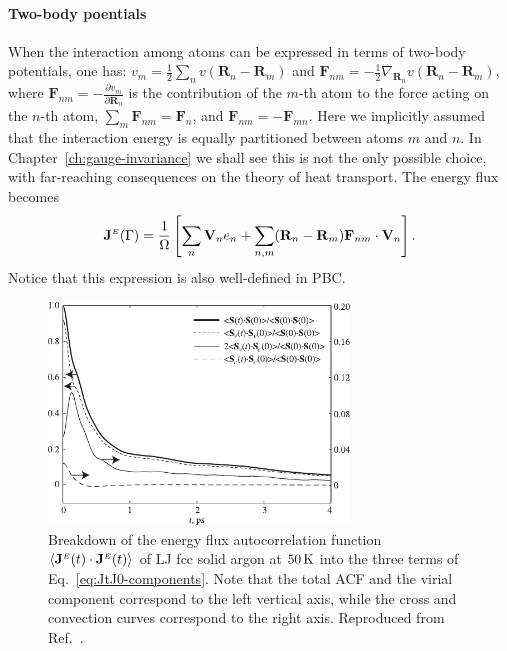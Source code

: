 \begin{LEtext}
\paragraph{Two-body poentials}
When the interaction among atoms can be expressed in terms of two-body potentials, one has: $v_m=\frac{1}{2}\sum_n v(\mathbf{R}_n- \mathbf{R}_m)$ and $\mathbf{F}_{n m} = - \frac{1}{2} \nabla_{\mathbf{R}_n} v(\mathbf{R}_n- \mathbf{R}_m)$, where $\mathbf{F}_{n m} = - \frac{\partial v_m}{\partial \mathbf{R}_n}$ is the contribution of the $m$-th atom to the force acting on the $n$-th atom, $\sum_m \mathbf{F}_{n m} = \mathbf{F}_{n}$, and $\mathbf{F}_{n m} = -\mathbf{F}_{m n}$. 
Here we implicitly assumed that the interaction energy is equally partitioned between atoms $m$ and $n$. In Chapter~\ref{ch:gauge-invariance} we shall see this is not the only possible choice, with far-reaching consequences on the theory of heat transport.
The energy flux becomes
\begin{equation}
    \mathbf{J}^\smallE(\rGamma) =
       \frac{1}{\rOmega} \left[ \sum_n \mathbf{V}_n e_n + \sum_{n,m} (\mathbf{R}_n-\mathbf{R}_m) \mathbf{F}_{n m} \cdot \mathbf{V}_n \right]. \label{eq:J-classical-2body}
\end{equation}
Notice that this expression is also well-defined in PBC.

\begin{figure}[tb]
    \centering
    \includegraphics[width=8cm]{chapters/chapter2/figures/McGaughey-argon-contributions.pdf}
    \caption{Breakdown of the energy flux autocorrelation function $\langle\mathbf{J}^{\scriptscriptstyle E}(t)\cdot\mathbf{J}^{\scriptscriptstyle E}(t)\rangle$ of LJ fcc solid argon at $50\,\mathrm{K}$ into the three terms of Eq.~\eqref{eq:JtJ0-components}. Note that the total ACF and the virial component correspond to the left vertical axis, while the cross and convection curves correspond to the right axis. Reproduced from Ref.~\cite{McGaughey2006}.}
    \label{fig:argon-convective}
\end{figure}


\end{LEtext}
